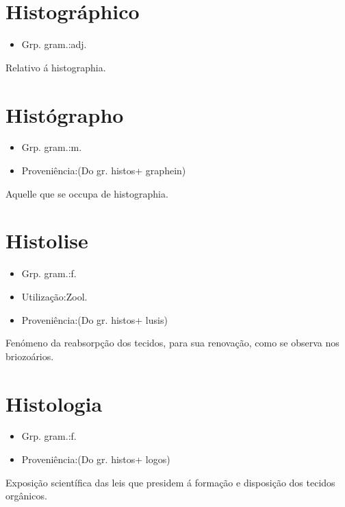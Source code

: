\documentclass{article}
\begin{document}
\section{Histográphico}
\begin{itemize}
\item {Grp. gram.:adj.}
\end{itemize}
Relativo á histographia.
\section{Histógrapho}
\begin{itemize}
\item {Grp. gram.:m.}
\end{itemize}
\begin{itemize}
\item {Proveniência:(Do gr. \textunderscore histos\textunderscore  + \textunderscore graphein\textunderscore )}
\end{itemize}
Aquelle que se occupa de histographia.
\section{Histolise}
\begin{itemize}
\item {Grp. gram.:f.}
\end{itemize}
\begin{itemize}
\item {Utilização:Zool.}
\end{itemize}
\begin{itemize}
\item {Proveniência:(Do gr. \textunderscore histos\textunderscore  + \textunderscore lusis\textunderscore )}
\end{itemize}
Fenómeno da reabsorpção dos tecidos, para sua renovação, como se observa nos briozoários.
\section{Histologia}
\begin{itemize}
\item {Grp. gram.:f.}
\end{itemize}
\begin{itemize}
\item {Proveniência:(Do gr. \textunderscore histos\textunderscore  + \textunderscore logos\textunderscore )}
\end{itemize}
Exposição scientífica das leis que presidem á formação e disposição dos tecidos orgânicos.
\end{document}
